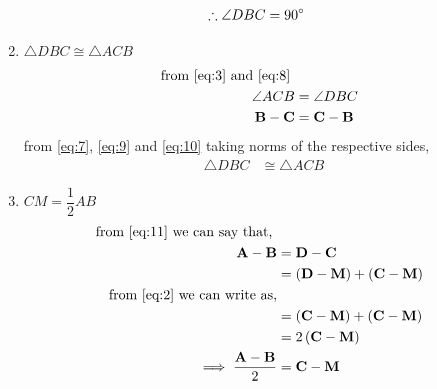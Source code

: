\documentclass[10pt]{article}
\providecommand{\brak}[1]{\ensuremath{\left(#1\right)}}
\let\vec\mathbf{}
\begin{document}
\begin{enumerate}
\begin{align}
	\therefore \angle DBC &= 90\degree
	\label{eq:8}
\end{align}
\item $\triangle DBC \cong \triangle ACB$
\begin{align}
	\text{ from  \eqref{eq:3} and \eqref{eq:8} }\\
	\angle ACB &= \angle DBC
	\label{eq:9}\\
	\vec{B}-\vec{C}&=\vec{C}-\vec{B}
	\label{eq:10}
\end{align}
from \eqref{eq:7}, \eqref{eq:9} and \eqref{eq:10} taking norms of the respective sides,
\begin{align}
	\triangle DBC &\cong \triangle ACB
	\label{eq:11}
\end{align}
\item $CM = \dfrac{1}{2}AB$
\begin{align}
	\text{ from \eqref{eq:11} we can say that, }\\
	\vec{A}-\vec{B}&=\vec{D}-\vec{C}\\
	&= \brak{\vec{D}-\vec{M}}+\brak{\vec{C}-\vec{M}}\\
	\text{ from \eqref{eq:2} we can write as,}\\
	& = \brak{\vec{C}-\vec{M}}+\brak{\vec{C}-\vec{M}}\\
	&= 2\brak{\vec{C}-\vec{M}}\\
	\implies \frac{\vec{A}-\vec{B}}{2}&=\vec{C}-\vec{M}
\end{align}
\end{enumerate}
\end{document}
